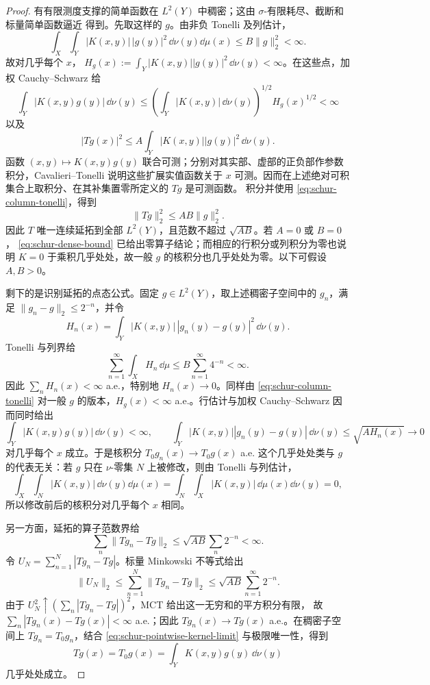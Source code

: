 \begin{proof}
有有限测度支撑的简单函数在 $L^2(Y)$ 中稠密；这由 $\sigma$-有限耗尽、截断和标量简单函数逼近
得到。先取这样的 $g$。由非负 Tonelli 及列估计，
\[
 \int_X\int_Y|K(x,y)|\,|g(y)|^2\,\dd\nu(y)\dd\mu(x)
 \le B\|g\|_2^2<\infty.
 \tag{3.4.24}\label{eq:schur-column-tonelli}
\]
故对几乎每个 $x$，
$H_g(x):=\int_Y|K(x,y)||g(y)|^2\,\dd\nu(y)<\infty$。在这些点，加权
Cauchy--Schwarz 给
\[
\int_Y|K(x,y)g(y)|\,\dd\nu(y)
 \le\left(\int_Y|K(x,y)|\,\dd\nu(y)\right)^{1/2}H_g(x)^{1/2}<\infty
\]
以及
\[
 |Tg(x)|^2
 \le A\int_Y|K(x,y)||g(y)|^2\,\dd\nu(y).
\]
函数 $(x,y)\mapsto K(x,y)g(y)$ 联合可测；分别对其实部、虚部的正负部作参数积分，Cavalieri--Tonelli
说明这些扩展实值函数关于 $x$ 可测。因而在上述绝对可积集合上取积分、在其补集置零所定义的
$Tg$ 是可测函数。
积分并使用 \eqref{eq:schur-column-tonelli}，得到
\[
 \|Tg\|_2^2\le AB\|g\|_2^2.
 \tag{3.4.25}\label{eq:schur-dense-bound}
\]
因此 $T$ 唯一连续延拓到全部 $L^2(Y)$，且范数不超过 $\sqrt{AB}$。若 $A=0$ 或 $B=0$，
\eqref{eq:schur-dense-bound} 已给出零算子结论；而相应的行积分或列积分为零也说明 $K=0$
于乘积几乎处处，故一般 $g$ 的核积分也几乎处处为零。以下可假设 $A,B>0$。

剩下的是识别延拓的点态公式。固定 $g\in L^2(Y)$，取上述稠密子空间中的 $g_n$，满足
$\|g_n-g\|_2\le2^{-n}$，并令
\[
 H_n(x)=\int_Y|K(x,y)|\,|g_n(y)-g(y)|^2\,\dd\nu(y).
\]
Tonelli 与列界给
\[
 \sum_{n=1}^{\infty}\int_XH_n\,\dd\mu
 \le B\sum_{n=1}^{\infty}4^{-n}<\infty.
\]
因此 $\sum_nH_n(x)<\infty$ a.e.，特别地 $H_n(x)\to0$。同样由
\eqref{eq:schur-column-tonelli} 对一般 $g$ 的版本，$H_g(x)<\infty$ a.e.。行估计与加权
Cauchy--Schwarz 因而同时给出
\[
 \int_Y|K(x,y)g(y)|\,\dd\nu(y)<\infty,
 \qquad
 \int_Y|K(x,y)||g_n(y)-g(y)|\,\dd\nu(y)
 \le\sqrt{A H_n(x)}\longrightarrow0
 \tag{3.4.26}\label{eq:schur-pointwise-kernel-limit}
\]
对几乎每个 $x$ 成立。于是核积分 $T_0g_n(x)\to T_0g(x)$ a.e.
这个几乎处处类与 $g$ 的代表无关：若 $g$ 只在 $\nu$-零集 $N$ 上被修改，则由
Tonelli 与列估计，
\[
 \int_X\int_N|K(x,y)|\,\dd\nu(y)\dd\mu(x)
 =\int_N\int_X|K(x,y)|\,\dd\mu(x)\dd\nu(y)=0,
\]
所以修改前后的核积分对几乎每个 $x$ 相同。

另一方面，延拓的算子范数界给
\[
 \sum_n\|Tg_n-Tg\|_2
 \le\sqrt{AB}\sum_n2^{-n}<\infty.
\]
令 $U_N=\sum_{n=1}^N|Tg_n-Tg|$。标量 Minkowski 不等式给出
\[
 \|U_N\|_2\le\sum_{n=1}^N\|Tg_n-Tg\|_2
 \le\sqrt{AB}\sum_{n=1}^{\infty}2^{-n}.
\]
由于 $U_N^2\uparrow(\sum_n|Tg_n-Tg|)^2$，MCT 给出这一无穷和的平方积分有限，
故 $\sum_n|Tg_n(x)-Tg(x)|<\infty$ a.e.；因此 $Tg_n(x)\to Tg(x)$ a.e.。在稠密子空间上
$Tg_n=T_0g_n$，结合 \eqref{eq:schur-pointwise-kernel-limit} 与极限唯一性，得到
\[
 Tg(x)=T_0g(x)=\int_YK(x,y)g(y)\,\dd\nu(y)
\]
几乎处处成立。
\end{proof}

